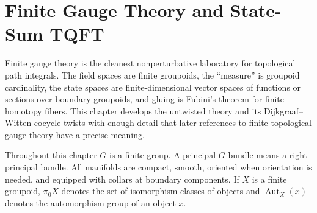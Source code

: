 \chapter{Finite Gauge Theory and State-Sum TQFT}
\label{ch:tqft-finite-gauge-state-sum}

\ConventionsEuclidean

Finite gauge theory is the cleanest nonperturbative laboratory for
topological path integrals.  The field spaces are finite groupoids, the
``measure'' is groupoid cardinality, the state spaces are finite-dimensional
vector spaces of functions or sections over boundary groupoids, and gluing is
Fubini's theorem for finite homotopy fibers.  This chapter develops the
untwisted theory and its Dijkgraaf--Witten cocycle twists with enough detail
that later references to finite topological gauge theory have a precise
meaning.

Throughout this chapter \(G\) is a finite group.  A principal \(G\)-bundle
means a right principal bundle.  All manifolds are compact, smooth,
oriented when orientation is needed, and equipped with collars at boundary
components.  If \(X\) is a finite groupoid, \(\pi_0X\) denotes the set of
isomorphism classes of objects and \(\operatorname{Aut}_X(x)\) denotes the
automorphism group of an object \(x\).

